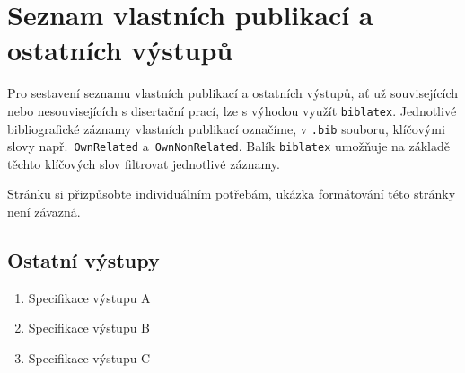 \chapter*{Seznam vlastních publikací a ostatních výstupů}
\label{sec:ListOfStudentsOwnPublicationActivitiesAndOtherOutcomes}
Pro sestavení seznamu vlastních publikací a ostatních výstupů, ať už souvisejících nebo nesouvisejících s disertační prací, lze s výhodou využít \verb|biblatex|. Jednotlivé bibliografické záznamy vlastních publikací označíme, v \verb|.bib| souboru, klíčovými slovy např.\ \verb|OwnRelated| a~\verb|OwnNonRelated|. Balík \verb|biblatex| umožňuje na základě těchto klíčových slov filtrovat jednotlivé záznamy.

Stránku si přizpůsobte individuálním potřebám, ukázka formátování této stránky není závazná.

\begin{refsection}
\nocite{MyRelatedArticle1, MyRelatedArticle2}
\printbibliography[keyword={OwnRelated}, heading=subbibintoc, title={Publikace a výstupy související s tématem práce}]
\end{refsection}

\begin{refsection}
\nocite{MyNonrelatedArticle1}
\printbibliography[keyword={OwnNonRelated}, heading=subbibintoc, title={Publikace a výstupy nesouvisející s tématem práce}]
\end{refsection}

\section*{Ostatní výstupy}
\begin{enumerate}
	\item Specifikace výstupu A
	\item Specifikace výstupu B
	\item Specifikace výstupu C
\end{enumerate}




